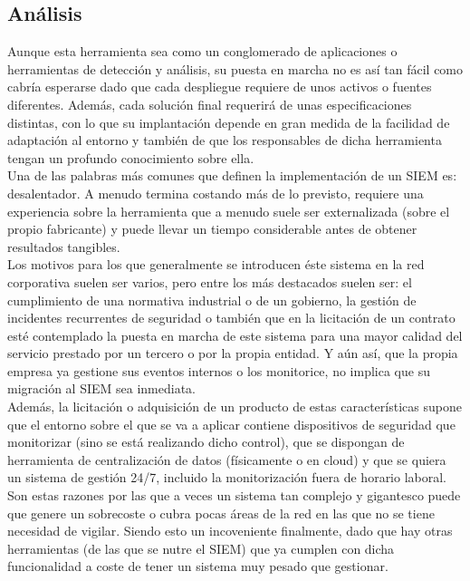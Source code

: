 \subsection{Análisis}

Aunque esta herramienta sea como un conglomerado de aplicaciones o herramientas de detección y análisis, su puesta en marcha no es así tan fácil como cabría esperarse dado que cada despliegue requiere de unos activos o fuentes diferentes. Además, cada solución final requerirá de unas especificaciones distintas, con lo que su implantación depende en gran medida de la facilidad de adaptación al entorno y también de que los responsables de dicha herramienta tengan un profundo conocimiento sobre ella.\\

Una de las palabras más comunes que definen la implementación de un SIEM es: desalentador. A menudo termina costando más de lo previsto, requiere una experiencia sobre la herramienta que a menudo suele ser externalizada (sobre el propio fabricante) y puede llevar un tiempo considerable antes de obtener resultados tangibles.\\

Los motivos para los que generalmente se introducen éste sistema en la red corporativa suelen ser varios, pero entre los más destacados suelen ser: el cumplimiento de una normativa industrial o de un gobierno, la gestión de incidentes recurrentes de seguridad o también que en la licitación de un contrato esté contemplado la puesta en marcha de este sistema para una mayor calidad del servicio prestado por un tercero o por la propia entidad. Y aún así, que la propia empresa ya gestione sus eventos internos o los monitorice, no implica que su migración al SIEM sea inmediata.\\

Además, la licitación o adquisición de un producto de estas características supone que el entorno sobre el que se va a aplicar contiene dispositivos de seguridad que monitorizar (sino se está realizando dicho control), que se dispongan de herramienta de centralización de datos (físicamente o en cloud) y que se quiera un sistema de gestión 24/7, incluido la monitorización fuera de horario laboral.\\

Son estas razones por las que a veces un sistema tan complejo y gigantesco puede que genere un sobrecoste o cubra pocas áreas de la red en las que no se tiene necesidad de vigilar. Siendo esto un incoveniente finalmente, dado que hay otras herramientas (de las que se nutre el SIEM) que ya cumplen con dicha funcionalidad a coste de tener un sistema muy pesado que gestionar.\\


